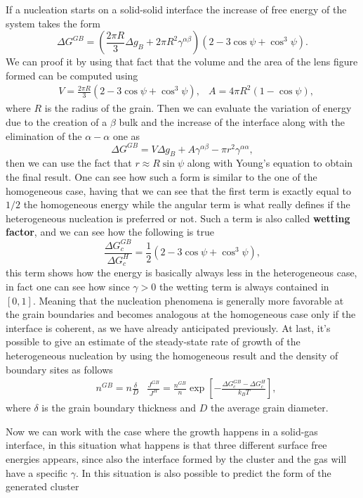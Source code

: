 {
    If a nucleation starts on a solid-solid interface the increase of free energy of the system takes the form
    \begin{equation}
        \Delta G^{GB} = \left( \frac{2\pi R}{3}\Delta g_B + 2\pi R^2\gamma^{\alpha\beta} \right)\left( 2 - 3\cos\psi + \cos^3\psi \right).
    \end{equation}
}
{
    We can proof it by using that fact that the volume and the area of the lens figure formed can be computed using
    \begin{align}
        &V = \frac{2\pi R}{3}( 2 - 3\cos\psi + \cos^3\psi ), &A = 4\pi R^2(1- \cos\psi),
    \end{align}
    where $R$ is the radius of the grain. Then we can evaluate the variation of energy due to the creation of a $\beta$ bulk and the increase of the interface along with the elimination of the $\alpha-\alpha$ one as
    \begin{equation}
        \Delta G^{GB} = V\Delta g_B + A\gamma^{\alpha\beta} - \pi r^2\gamma^{\alpha\alpha},
    \end{equation}
    then we can use the fact that $r \approx R\sin\psi$ along with Young's equation to obtain the final result.
}
\noindent
One can see how such a form is similar to the one of the homogeneous case, having that we can see that the first term is exactly equal to $1/2$ the homogeneous energy while the angular term is what really defines if the heterogeneous nucleation is preferred or not. Such a term is also called \textbf{wetting factor}, and we can see how the following is true
\begin{equation}
    \frac{\Delta G_c^{GB}}{\Delta G_c^H} = \frac{1}{2}\left( 2 - 3\cos\psi + \cos^3\psi \right),
\end{equation}
this term shows how the energy is basically always less in the heterogeneous case, in fact one can see how since $\gamma > 0$ the wetting term is always contained in $[0, 1]$. Meaning that the nucleation phenomena is generally more favorable at the grain boundaries and becomes analogous at the homogeneous case only if the interface is coherent, as we have already anticipated previously. At last, it's possible to give an estimate of the steady-state rate of growth of the heterogeneous nucleation by using the homogeneous result and the density of boundary sites  as follows
\begin{align}
    &n^{GB} = n\frac{\delta}{D} &\frac{J^{GB}}{J^H} = \frac{n^{GB}}{n}\exp\left[ -\frac{\Delta G_c^{GB} - \Delta G_c^H}{k_BT} \right],
\end{align}
where $\delta$ is the grain boundary thickness and $D$ the average grain diameter.

Now we can work with the case where the growth happens in a solid-gas interface, in this situation what happens is that three different surface free energies appears, since also the interface formed by the cluster and the gas will have a specific $\gamma$. In this situation is also possible to predict the form of the generated cluster 